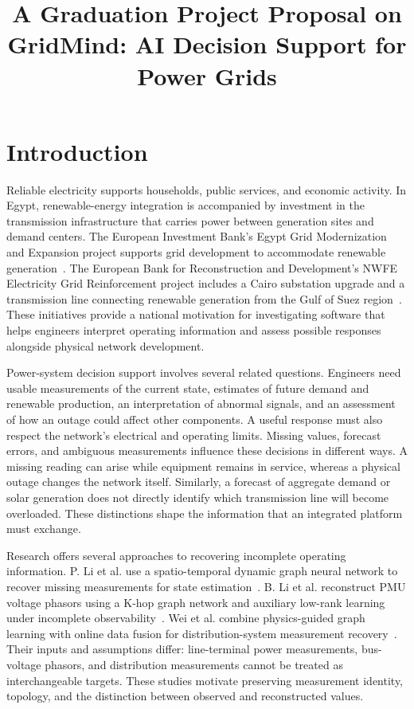 \documentclass[journal,letterpaper]{IEEEtran}
\title{A Graduation Project Proposal on\\GridMind: AI Decision Support for Power Grids}
\author{}
\begin{document}
\maketitle
\pagestyle{gridmind}\thispagestyle{gridmind}

\section{Introduction}
Reliable electricity supports households, public services, and economic activity. In Egypt, renewable-energy integration is accompanied by investment in the transmission infrastructure that carries power between generation sites and demand centers. The European Investment Bank's Egypt Grid Modernization and Expansion project supports grid development to accommodate renewable generation~\cite{EIB}. The European Bank for Reconstruction and Development's NWFE Electricity Grid Reinforcement project includes a Cairo substation upgrade and a transmission line connecting renewable generation from the Gulf of Suez region~\cite{EBRD}. These initiatives provide a national motivation for investigating software that helps engineers interpret operating information and assess possible responses alongside physical network development.

Power-system decision support involves several related questions. Engineers need usable measurements of the current state, estimates of future demand and renewable production, an interpretation of abnormal signals, and an assessment of how an outage could affect other components. A useful response must also respect the network's electrical and operating limits. Missing values, forecast errors, and ambiguous measurements influence these decisions in different ways. A missing reading can arise while equipment remains in service, whereas a physical outage changes the network itself. Similarly, a forecast of aggregate demand or solar generation does not directly identify which transmission line will become overloaded. These distinctions shape the information that an integrated platform must exchange.

Research offers several approaches to recovering incomplete operating information. P. Li et al. use a spatio-temporal dynamic graph neural network to recover missing measurements for state estimation~\cite{S28}. B. Li et al. reconstruct PMU voltage phasors using a K-hop graph network and auxiliary low-rank learning under incomplete observability~\cite{N01}. Wei et al. combine physics-guided graph learning with online data fusion for distribution-system measurement recovery~\cite{S29}. Their inputs and assumptions differ: line-terminal power measurements, bus-voltage phasors, and distribution measurements cannot be treated as interchangeable targets. These studies motivate preserving measurement identity, topology, and the distinction between observed and reconstructed values.
\end{document}
